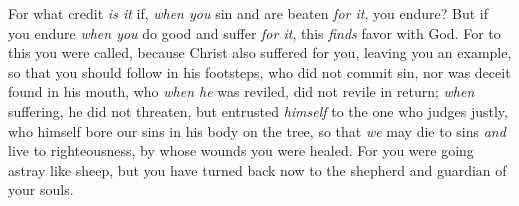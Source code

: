 \begin{biblechapter}
\verse For what credit \textit{is it} if, \textit{when you} sin and are beaten \textit{for it}, you endure? But if you endure \textit{when you} do good and suffer \textit{for it}, this \textit{finds} favor with God.
\verse For to this you were called, because Christ also suffered for you, leaving you an example, so that you should follow in his footsteps,
\verse who did not commit sin, nor was deceit found in his mouth,
\verse who \textit{when he} was reviled, did not revile in return; \textit{when} suffering, he did not threaten, but entrusted \textit{himself} to the one who judges justly,
\verse who himself bore our sins in his body on the tree, so that \textit{we} may die to sins \textit{and} live to righteousness, by whose wounds you were healed.
\verse For you were going astray like sheep, but you have turned back now to the shepherd and guardian of your souls.
\end{biblechapter}

